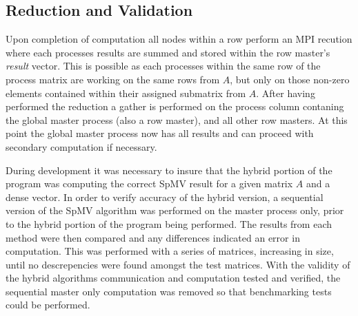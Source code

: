 \subsection{Reduction and Validation}

Upon completion of computation all nodes within a row perform an MPI recution where each processes results are summed and stored within the row master's \emph{result} vector.
This is possible as each processes within the same row of the process matrix are working on the same rows from $A$, but only on those non-zero elements contained within their assigned submatrix from $A$. 
After having performed the reduction a gather is performed on the process column contaning the global master process (also a row master), and all other row masters.
At this point the global master process now has all results and can proceed with secondary computation if necessary. 

During development it was necessary to insure that the hybrid portion of the program was computing the correct SpMV result for a given matrix $A$ and a dense vector.
In order to verify accuracy of the hybrid version, a sequential version of the SpMV algorithm was performed on the master process only, prior to the hybrid portion of the program being performed.
The results from each method were then compared and any differences indicated an error in computation.
This was performed with a series of matrices, increasing in size, until no descrepencies were found amongst the test matrices. 
With the validity of the hybrid algorithms communication and computation tested and verified, the sequential master only computation was removed so that benchmarking tests could be performed. 

